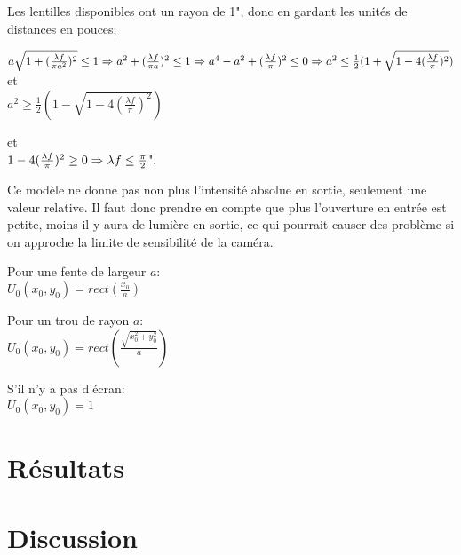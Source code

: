\documentclass[11pt,letterpaper]{article}
\begin{document}
Les lentilles disponibles ont un rayon de 1", donc en gardant les unités de distances en pouces;

$
a\sqrt{1+(\frac{\lambda f}{\pi a^2})^2} \leq 1\\
\Rightarrow a^2+(\frac{\lambda f}{\pi a})^2 \leq 1 \\
\Rightarrow a^4-a^2+(\frac{\lambda f}{\pi})^2 \leq 0 \\
\Rightarrow
a^2 \leq \frac{1}{2}(1+\sqrt{1-4(\frac{\lambda f}{\pi})^2})\\
$
et \\
$a^2 \geq \frac{1}{2}(1-\sqrt{1-4(\frac{\lambda f}{\pi})^2})$

et \\
$1-4(\frac{\lambda f}{\pi})^2 \geq 0 \\
\Rightarrow \lambda f \leq \frac{\pi}{2}$".


Ce modèle ne donne pas non plus l'intensité absolue en sortie, seulement une valeur relative. Il faut donc prendre en compte que plus l'ouverture en entrée est petite, moins il y aura de lumière en sortie, ce qui pourrait causer des problème si on approche la limite de sensibilité de la caméra.

Pour une fente de largeur $a$:\\ 
    $U_0(x_0,y_0)=rect(\frac{x_0}{a})$

Pour un trou de rayon $a$:\\ 
    $U_0(x_0,y_0)=rect(\frac{\sqrt{x_0^2+y_0^2}}{a})$

S'il n'y a pas d'écran: \\
    $U_0(x_0,y_0)=1$

\section{Résultats}

\section{Discussion}


\end{document}
